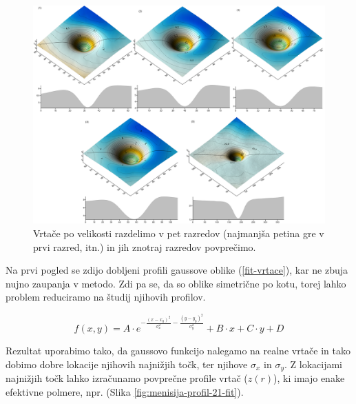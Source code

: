 \documentclass[a4paper, oneside, 12pt]{book}
\begin{document}
        \begin{figure}
          \centering
          \includegraphics[width=19cm,angle=90]{slike/vrtace-po-razredih-menisija}
          \caption{Vrtače po velikosti razdelimo v pet razredov (najmanjša petina gre v prvi razred, itn.) in jih znotraj razredov povprečimo.}
          \label{fig:menisija-vrtace-po-razredih}
        \end{figure}

        Na prvi pogled se zdijo dobljeni profili gaussove oblike (\ref{fit-vrtace}), kar ne zbuja nujno zaupanja v metodo. Zdi pa se, da so oblike simetrične po kotu, torej lahko problem reduciramo na študij njihovih profilov. 

        \begin{equation}
          f(x,y) = A \cdot e^{-\frac{(x-x_0)^2}{\sigma_x^2}-\frac{(y-y_0)^2}{\sigma_y^2}} + B \cdot x + C \cdot y + D  
          \label{fit-vrtace}
        \end{equation}

        Rezultat uporabimo tako, da gaussovo funkcijo nalegamo na realne vrtače in tako dobimo dobre lokacije njihovih najnižjih točk, ter njihove $\sigma_x$ in $\sigma_y$. Z lokacijami najnižjih točk lahko izračunamo povprečne profile vrtač ($z(r)$), ki imajo enake efektivne polmere, npr. (Slika \ref{fig:menisija-profil-21-fit}).
\end{document}
